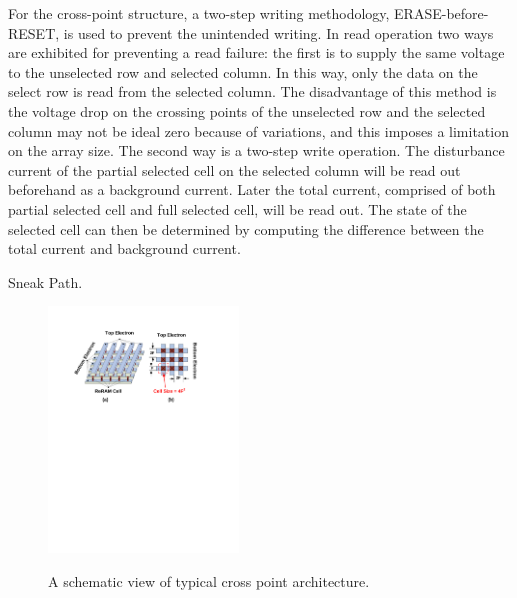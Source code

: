 For the cross-point structure, a two-step writing methodology, ERASE-before-RESET, is used to prevent the unintended writing. In read operation two ways are exhibited for preventing a read failure: the first is to supply the same voltage to the unselected row and selected column. In this way, only the data on the select row is read from the selected column. The disadvantage of this method is the voltage drop on the crossing points of the unselected row and the selected column may not be ideal zero because of variations, and this imposes a limitation on the array size. The second way is a two-step write operation. The disturbance current of the partial selected cell on the selected column will be read out beforehand as a background current. Later the total current, comprised of both partial selected cell and full selected cell, will be read out. The state of the selected cell can then be determined by computing the difference between the total current and background current.


Sneak Path.
\begin{figure}
\centering
  \includegraphics[width=0.45\textwidth]{./figures/crossbar_array2.pdf}\\
  \caption{A schematic view of typical cross point architecture.}\label{fig:array}
\end{figure}

